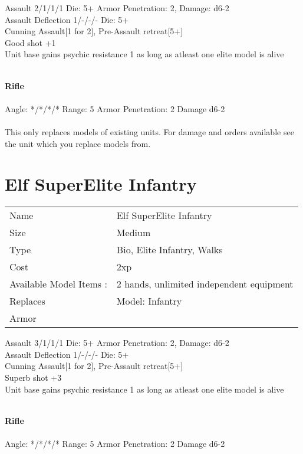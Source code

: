 Assault 2/1/1/1 Die: 5+ Armor Penetration: 2, Damage: d6-2 \\
Assault Deflection 1/-/-/- Die: 5+\\
Cunning Assault[1 for 2], Pre-Assault retreat[5+]
\ \\

Good shot +1\\ Unit base gains psychic resistance 1 as long as atleast one elite model is alive

\ \\
{\bf Rifle } \\
\ \\
Angle: */*/*/* Range: 5 Armor Penetration: 2 Damage d6-2 \\
\indent  \\





This only replaces models of existing units. For damage and orders available see the unit which you replace models from.



\pagebreak

\section{ Elf SuperElite Infantry }

\begin{tabular}{ll}
  Name & Elf SuperElite Infantry \\
  Size & Medium\\
  Type & Bio, Elite Infantry, Walks\\
  Cost & 2xp\\
  Available Model Items : &2 hands, unlimited independent equipment\\
  Replaces & Model: Infantry\\
  Armor & 
\end{tabular}



Assault 3/1/1/1 Die: 5+ Armor Penetration: 2, Damage: d6-2 \\
Assault Deflection 1/-/-/- Die: 5+\\
Cunning Assault[1 for 2], Pre-Assault retreat[5+]
\ \\

Superb shot +3\\ Unit base gains psychic resistance 1 as long as atleast one elite model is alive

\ \\
{\bf Rifle } \\
\ \\
Angle: */*/*/* Range: 5 Armor Penetration: 2 Damage d6-2 \\
\indent  \\





